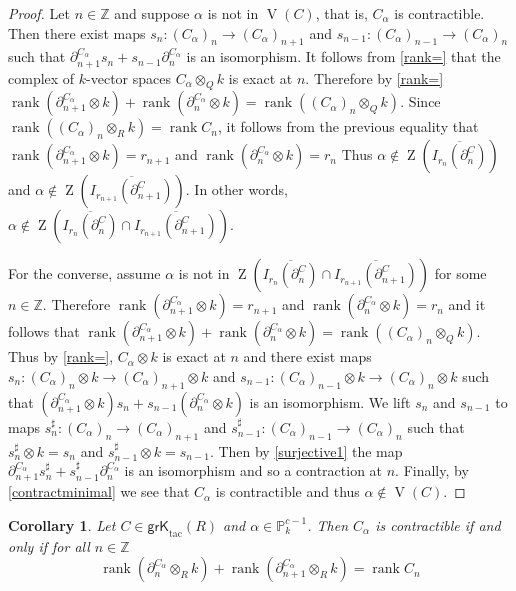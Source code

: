 \documentclass{amsart}[11pt]
\newcommand{\rank}{\operatorname{rank}}
\newcommand{\V}{\operatorname{V}}
\newcommand{\Z}{\operatorname{Z}}
\newcommand{\grKtac}{\operatorname{\mathsf{grK}_{tac}}\nolimits}
\numberwithin{equation}{section}
\theoremstyle{plain}
\newtheorem*{Main Theorem}{Main Theorem}
\newtheorem{corollary}[theorem]{Corollary}
\theoremstyle{definition}
\theoremstyle{remark}
\numberwithin{equation}{theorem}
\begin{document}
\begin{proof} Let $n\in\mathbb Z$ and suppose $\alpha$ is not in $\V(C)$, that is, $C_\alpha$ is contractible. Then there exist maps
$s_n:(C_\alpha)_n\to(C_\alpha)_{n+1}$ and $s_{n-1}:(C_\alpha)_{n-1}\to(C_\alpha)_n$
such that $\partial_{n+1}^{C_\alpha}s_n+s_{n-1}\partial_n^{C_\alpha}$ is an isomorphism. 
It follows from \ref{rank=} that the complex of $k$-vector spaces $C_\alpha\otimes_Qk$ is exact at $n$.  Therefore by \ref{rank=} $\rank(\partial^{C_\alpha}_{n+1}\otimes k)+\rank(\partial^{C_\alpha}_n\otimes k)=\rank((C_\alpha)_n\otimes_Qk)$.  Since $\rank((C_\alpha)_n\otimes_Rk)=\rank C_n$, it follows from the previous equality that 
$\rank(\partial^{C_\alpha}_{n+1}\otimes k)=r_{n+1}$ and $\rank(\partial^{C_\alpha}_n\otimes k)=r_n$ Thus 
$\alpha\notin \Z(\overline{I_{r_n}(\partial^C_n)})$ and 
$\alpha\notin \Z(\overline{I_{r_{n+1}}(\partial^C_{n+1})})$. In other words, 
$\alpha\notin \Z\left(\overline{I_{r_n}(\partial^C_n)}\cap\overline{I_{r_{n+1}}(\partial^C_{n+1})}\right)$.

For the converse, assume $\alpha$ is not in $\Z\left(\overline{I_{r_n}(\partial^C_n)}\cap\overline{I_{r_{n+1}}(\partial^C_{n+1})}\right)$ for some $n\in\mathbb Z$. Therefore 
$\rank(\partial^{C_\alpha}_{n+1}\otimes k)=r_{n+1}$ and $\rank(\partial^{C_\alpha}_n\otimes k)=r_n$ 
and it follows that 
$\rank(\partial^{C_\alpha}_{n+1}\otimes k)+\rank(\partial^{C_\alpha}_n\otimes k)=\rank((C_\alpha)_n\otimes_Qk)$.  Thus by \ref{rank=}, $C_\alpha\otimes k$ is exact at $n$ and there exist maps $s_n:(C_\alpha)_n\otimes k\to(C_\alpha)_{n+1}\otimes k$ and $s_{n-1}:(C_\alpha)_{n-1}\otimes k\to(C_\alpha)_n\otimes k$
such that $(\partial_{n+1}^{C_\alpha}\otimes k)s_n+s_{n-1}(\partial_n^{C_\alpha}\otimes k)$ is an isomorphism. We lift $s_n$ and $s_{n-1}$ to maps
$s^\sharp_n:(C_\alpha)_n\to(C_\alpha)_{n+1}$ and $s^\sharp_{n-1}:(C_\alpha)_{n-1}\to(C_\alpha)_n$
such that $s^\sharp_n\otimes k=s_n$ and $s^\sharp_{n-1}\otimes k=s_{n-1}$. Then by \ref{surjective1} the map
$\partial_{n+1}^{C_\alpha}s^\sharp_n+s^\sharp_{n-1}\partial_n^{C_\alpha}$ is an isomorphism and so a contraction at $n$. Finally, by \ref{contractminimal} we see that $C_\alpha$ is contractible and thus 
$\alpha\notin\V(C)$.
\end{proof}

\begin{corollary}\label{closedcor} Let $C\in\grKtac(R)$ and $\alpha\in\mathbb P^{c-1}_k$.  Then $C_\alpha$ is 
contractible if and only if for all $n\in\mathbb Z$
\[
\rank(\partial^{C_\alpha}_n\otimes_R k)+\rank(\partial^{C_\alpha}_{n+1}\otimes_Rk)=\rank C_n
\]
\end{corollary}
\end{document}

